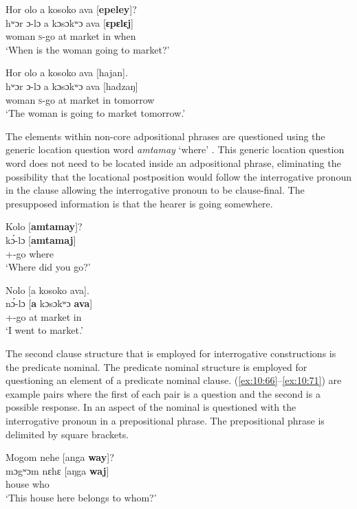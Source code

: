 \ea \label{ex:10:62}
Hor  olo  a  kosoko  ava  [\textbf{epeley}]?\\
\gll  hʷɔr    ɔ-lɔ  a  kɔsɔkʷɔ  ava  [\textbf{ɛpɛlɛj}]\\
      woman  \textsc{s}-go  at  market  in  when\\
\glt  ‘When is the woman going to market?’
\z

\ea \label{ex:10:63}
Hor  olo  a  kosoko  ava  [hajan].\\
\gll  hʷɔr    ɔ{}-lɔ  a  kɔsɔkʷɔ  ava  [hadzaŋ]\\
      woman  \textsc{s}-go  at  market  in  tomorrow\\
\glt  ‘The woman is going to market tomorrow.’
\z

The elements within non-core adpositional phrases are questioned using the generic location question word \textit{amtamay }‘where’ . This generic location question word does not need to be located inside an adpositional phrase, eliminating the possibility that the locational postposition would follow the interrogative pronoun in the clause allowing the interrogative pronoun to be clause-final. The presupposed information is that the hearer is going somewhere. 

\ea \label{ex:10:64}
Kolo  [\textbf{amtamay}]?\\
\gll  k\'{ɔ}-lɔ  [\textbf{amtamaj}] \\
      {\twoS}+{\PFV}-go  where\\
\glt  ‘Where did you go?’
\z

\ea \label{ex:10:65}
Nolo  [a  kosoko  ava].\\
\gll  n\'{ɔ}-lɔ  [\textbf{a} kɔsɔkʷɔ    \textbf{ava}] \\
      {\oneS}+{\PFV}-go  at  market    in\\
\glt  ‘I went to market.’
\z

The second clause structure that is employed for interrogative constructions is the predicate nominal. The predicate nominal structure is employed for questioning an element of a predicate nominal clause. (\ref{ex:10:66}–\ref{ex:10:71}) are example pairs where the first of each pair is a question and the second is a possible response. In  an aspect of the nominal is questioned with the interrogative pronoun in a prepositional phrase. The prepositional phrase is delimited by square brackets.

\ea \label{ex:10:66}
Mogom  nehe  [anga  \textbf{way}]?\\
\gll mɔgʷɔm  nɛhɛ  [aŋga  \textbf{waj}]\\
      house  {\DEM}  {\POSS}  who\\
\glt  ‘This house here belongs to whom?’
\z

